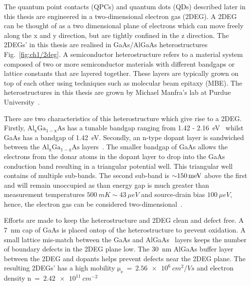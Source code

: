 The quantum point contacts (QPCs) and quantum dots (QDs) described later in this thesis are engineered in a two-dimensional electron gas (2DEG). A 2DEG can be thought of as a two dimensional plane of electrons which can move freely along the x and y direction, but are tightly confined in the z direction. The 2DEGs' in this thesis are realised in GaAs/AlGaAs heterostructures Fig.~\ref{fig:ch1/2deg}. A semiconductor heterostructure refers to a material system composed of two or more semiconductor materials with different bandgaps or lattice constants that are layered together. These layers are typically grown on top of each other using techniques such as molecular beam epitaxy (MBE). The heterostructures in this thesis are grown by Michael Manfra's lab at Purdue University~\cite{manfra_high_quality}. 

There are two characteristics of this heterostructure which give rise to a 2DEG. Firstly, $\mathrm{Al_xGa_{1-x}As}$ has a tunable bandgap ranging from 1.42 - \qty{2.16}{eV}~\cite{gaas_overview} whilst GaAs has a bandgap of \qty{1.42}{eV}. Secondly, an n-type dopant layer is sandwiched between the $\mathrm{Al_xGa_{1-x}As}$ layers~\cite{dopant_layer}. The smaller bandgap of GaAs allows the electrons from the donar atoms in the dopant layer to drop into the GaAs conduction band resulting in a triangular potential well. This triangular well contains of multiple sub-bands. The second sub-band is $\qty{\sim 150}{meV}$ above the first and will remain unoccupied as than energy gap is much greater than measurement temperatures $\qty{500}{mK}\sim\qty{43}{\mu eV}$ and source-drain bias $\qty{100}{\mu eV}$, hence, the electron gas can be considered two-dimensional~\cite{BEENAKKER_1991}.

Efforts are made to keep the heterostructure and 2DEG clean and defect free. A \qty{7}{nm} cap of GaAs is placed ontop of the heterostructure to prevent oxidation. A small lattice mis-match between the GaAs and AlGaAs~\cite{gaas_superlattice} layers keeps the number of boundary defects in the 2DEG plane low. The \qty{30}{nm} AlGaAs buffer layer between the 2DEG and dopants helps prevent defects near the 2DEG plane. The resulting 2DEGs' has a high mobility $\mathrm{\mu_e}~=~\qty{2.56e6}{cm^2/Vs}$ and electron density $\mathrm{n}~=~\qty{2.42e11}{cm^{-2}}$

